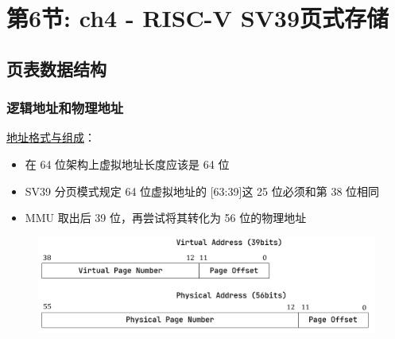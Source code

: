 \section{第6节: ch4 - RISC-V SV39页式存储}%
\subsection{页表数据结构}
% 
\begin{frame}
    \frametitle{逻辑地址和物理地址}
% 
\href{https://rcore-os.github.io/rCore-Tutorial-Book-v3/chapter4/3sv39-implementation-1.html\#id3}{地址格式与组成}：
% 
        \begin{itemize}
        \item 在 64 位架构上虚拟地址长度应该是 64 位
        \item SV39 分页模式规定 64 位虚拟地址的 [63:39]这 25 位必须和第 38 位相同
        \item MMU 取出后 39 位，再尝试将其转化为 56 位的物理地址
        \end{itemize}
    \begin{figure}
        \centering
        \includegraphics[width=0.8\linewidth]{figs/sv39-va-pa.png}
    \end{figure}
% 
% 
% 
\end{frame}
